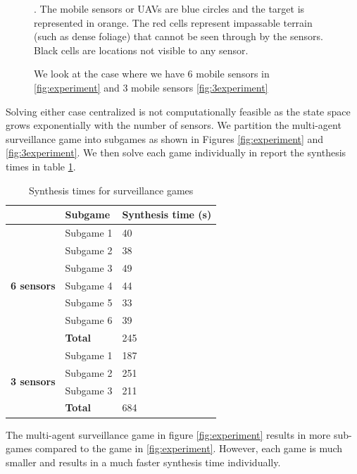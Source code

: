 \begin{figure}
{\hspace{.3cm}}

\caption{We look at the case where we have 6 mobile sensors in \ref{fig:experiment} and 3 mobile sensors \ref{fig:3experiment}\label{fig:bigexp}}. The mobile sensors or UAVs are blue circles and the target is represented in orange. The red cells represent impassable terrain (such as dense foliage) that cannot be seen through by the sensors. Black cells are locations not visible to any sensor.
\end{figure} 

Solving either case centralized is not computationally feasible as the state space grows exponentially with the number of sensors. We partition the multi-agent surveillance game into subgames as shown in Figures \ref{fig:experiment} and \ref{fig:3experiment}. We then solve each game individually in report the synthesis times in table \ref{tab:synthtime}.

\begin{table}[h!]
	\centering
	\caption{Synthesis times for surveillance games}
	\label{tab:synthtime}
	\begin{tabular}{c|l|l}
		\multicolumn{1}{l|}{}                                    & \textbf{Subgame} & \textbf{Synthesis time (s)} \\ \hline \hline
		\multirow{7}{*}{\textbf{6 sensors}}                     & Subgame 1        & 40                          \\
		& Subgame 2        & 38                          \\
		& Subgame 3        & 49                          \\
		& Subgame 4        & 44                          \\
		& Subgame 5        & 33                          \\
		& Subgame 6        & 39                          \\ \hline
		& \textbf{Total}            & 245                         \\ \hline
		\multicolumn{1}{l|}{\multirow{4}{*}{\textbf{3 sensors}}} & Subgame 1        & 187                         \\
		\multicolumn{1}{l|}{}                                    & Subgame 2        & 251                         \\
		\multicolumn{1}{l|}{}                                    & Subgame 3        & 211                         \\
		\multicolumn{1}{l|}{}                                    & \textbf{Total}            & 684                        
	\end{tabular}
\end{table}

The multi-agent surveillance game in figure \ref{fig:experiment} results in more sub-games compared to the game in \ref{fig:experiment}. However, each game is much smaller and results in a much faster synthesis time individually. 